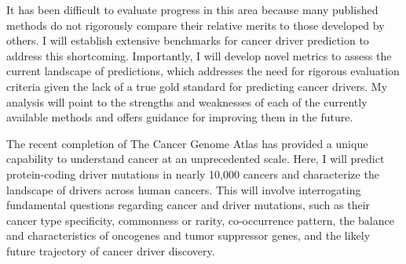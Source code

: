 It has been difficult to evaluate progress in this area because many published methods do not rigorously compare their relative merits to those developed by others. I will establish extensive benchmarks for cancer driver prediction to address this shortcoming. Importantly, I will develop novel metrics to assess the current landscape of predictions, which addresses the need for rigorous evaluation criteria given the lack of a true gold standard for predicting cancer drivers. My analysis will point to the strengths and weaknesses of each of the currently available methods and offers guidance for improving them in the future.

The recent completion of The Cancer Genome Atlas has provided a unique capability to understand cancer at an unprecedented scale. Here, I will predict protein-coding driver mutations in nearly 10,000 cancers and characterize the landscape of drivers across human cancers. This will involve interrogating fundamental questions regarding cancer and driver mutations, such as their cancer type specificity, commonness or rarity, co-occurrence pattern, the balance and characteristics of oncogenes and tumor suppressor genes, and the likely future trajectory of cancer driver discovery.




